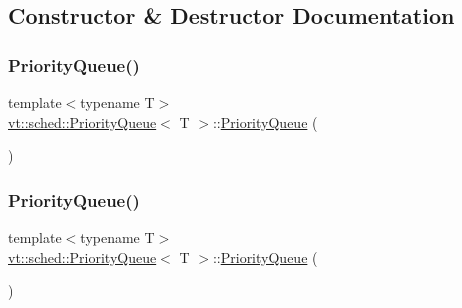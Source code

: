 \subsection{Constructor \& Destructor Documentation}
\mbox{\label{structvt_1_1sched_1_1_priority_queue_a03986418bd682344f22d1e0a5d4a3e3a}} 
\subsubsection{\texorpdfstring{Priority\+Queue()}{PriorityQueue()}\hspace{0.1cm}{\footnotesize\ttfamily [1/3]}}
{\footnotesize\ttfamily template$<$typename T$>$ \\
\hyperlink{structvt_1_1sched_1_1_priority_queue}{vt\+::sched\+::\+Priority\+Queue}$<$ T $>$\+::\hyperlink{structvt_1_1sched_1_1_priority_queue}{Priority\+Queue} (\begin{DoxyParamCaption}{ }\end{DoxyParamCaption})\hspace{0.3cm}{\ttfamily [default]}}

\mbox{\label{structvt_1_1sched_1_1_priority_queue_aca0fe178fbd601fa22816c2d895d5435}} 
\subsubsection{\texorpdfstring{Priority\+Queue()}{PriorityQueue()}\hspace{0.1cm}{\footnotesize\ttfamily [2/3]}}
{\footnotesize\ttfamily template$<$typename T$>$ \\
\hyperlink{structvt_1_1sched_1_1_priority_queue}{vt\+::sched\+::\+Priority\+Queue}$<$ T $>$\+::\hyperlink{structvt_1_1sched_1_1_priority_queue}{Priority\+Queue} (\begin{DoxyParamCaption}\item[{\hyperlink{structvt_1_1sched_1_1_priority_queue}{Priority\+Queue}$<$ T $>$ const \&}]{ }\end{DoxyParamCaption})\hspace{0.3cm}{\ttfamily [default]}}

